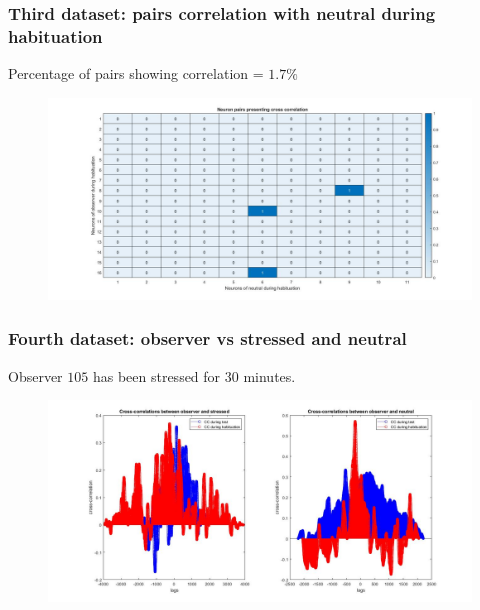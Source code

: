 \documentclass{beamer}
\begin{document}
\begin{frame}
\frametitle{Third dataset: pairs correlation with neutral during habituation}

Percentage of pairs showing correlation = $ 1.7\%$

\begin{figure}[H]
	\begin{center}
		\hspace*{-1cm}
		\includegraphics[scale=.28]{neuron_corr_neut_hab3.jpg} 
	\end{center}  
	
	
\end{figure}

\end{frame}








\begin{frame}
\frametitle{Fourth dataset: observer vs stressed and neutral}

Observer $105$ has been stressed for $30$ minutes.

\begin{figure}[H]
	\begin{center}
		\hspace*{-1cm}
		\includegraphics[scale=.30]{obs_stress_neut4.jpg} 
	\end{center}  
	
	
\end{figure}

\end{frame}
\end{document}

